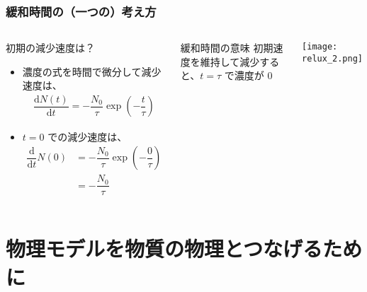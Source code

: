 \documentclass[12pt, dvipdfmx]{beamer}
\begin{document}
\begin{frame}
	\frametitle{緩和時間の（一つの）考え方}
		\begin{columns}[T, onlytextwidth]
				\begin{block}{初期の減少速度は？}
					\begin{itemize}
						\item 濃度の式を時間で微分して減少速度は、
						\footnotesize
						\begin{align*}
							\dfrac{\mathrm{d}N(t)}{\mathrm{d}t} = -\dfrac{N_0}{\tau} \exp \left(-\dfrac{t}{\tau} \right)
						\end{align*}
						\normalsize
						\item $t=0$ での減少速度は、
						\footnotesize
						\begin{align*}
							\dfrac{\mathrm{d}}{\mathrm{d}t}N(0) &=-\dfrac{N_0}{\tau} \exp \left(-\dfrac{0}{\tau} \right) \\
							&=-\dfrac{N_0}{\tau}
						\end{align*}
						\normalsize 
					\end{itemize}
				\end{block}
				\begin{alertblock}{緩和時間の意味}
					初期速度を維持して減少すると、$t=\tau$ で濃度が 0
				\end{alertblock}
				\begin{center}
					\textcolor{red}{}
					\texttt{[image: relux\_2.png]}
				\end{center}
		\end{columns}
\end{frame}

\section{物理モデルを物質の物理とつなげるために}
\end{document}
